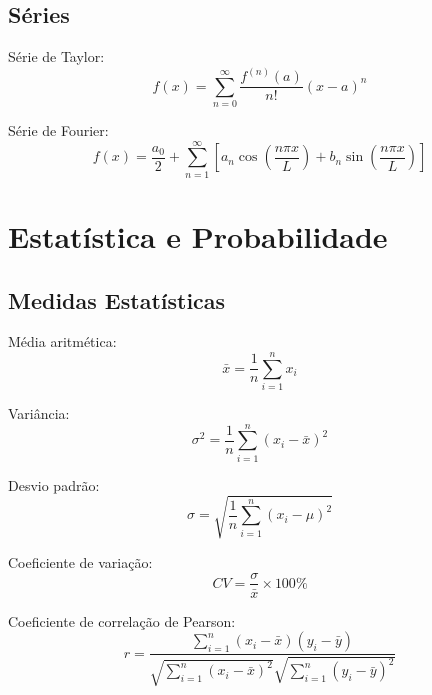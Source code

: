 \subsection{Séries}

Série de Taylor:
\begin{equation}
f(x) = \sum_{n=0}^{\infty} \frac{f^{(n)}(a)}{n!}(x-a)^n
\end{equation}

Série de Fourier:
\begin{equation}
f(x) = \frac{a_0}{2} + \sum_{n=1}^{\infty} \left[a_n \cos\left(\frac{n\pi x}{L}\right) + b_n \sin\left(\frac{n\pi x}{L}\right)\right]
\end{equation}


\section{Estatística e Probabilidade}

\subsection{Medidas Estatísticas}

Média aritmética:
\begin{equation}
\bar{x} = \frac{1}{n}\sum_{i=1}^{n} x_i
\end{equation}

Variância:
\begin{equation}
\sigma^2 = \frac{1}{n}\sum_{i=1}^{n}(x_i - \bar{x})^2
\end{equation}

Desvio padrão:
\begin{equation}
\sigma = \sqrt{\frac{1}{n}\sum_{i=1}^{n}(x_i - \mu)^2}
\end{equation}

Coeficiente de variação:
\begin{equation}
CV = \frac{\sigma}{\bar{x}} \times 100\%
\end{equation}

Coeficiente de correlação de Pearson:
\begin{equation}
r = \frac{\sum_{i=1}^{n}(x_i - \bar{x})(y_i - \bar{y})}{\sqrt{\sum_{i=1}^{n}(x_i - \bar{x})^2}\sqrt{\sum_{i=1}^{n}(y_i - \bar{y})^2}}
\end{equation}


